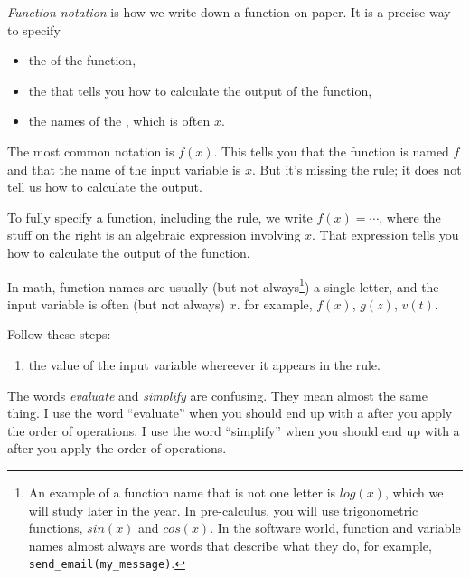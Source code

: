 \documentclass[fleqn,letterpaper,12pt,printwatermark=false]{memoir}
\begin{document}


\begin{myLesson}[][]
    \emph{Function notation}
    is how we write down a function on paper.
    It is a precise way to specify
    \begin{itemize}
        \item the  of the function,
        \item the  that tells you how to calculate the output of the function,
        \item the names of the , which is often $x$.
    \end{itemize}

    \begin{myLessonBox}
    The most common notation is $f(x)$.
    This tells you that the function is named $f$ 
    and that the name of the input variable is $x$.
    But it's missing the rule; 
    it does not tell us how to calculate the output.

    To fully specify a function, including the rule, we write $f(x) = \cdots$,
    where the stuff on the right is an algebraic expression involving $x$.
    That expression tells you how to calculate the output of the function.
    \end{myLessonBox}

    In math,
    function names are usually (but not always\footnote{
        An example of a function name that is not one letter 
        is $log(x)$, which we will study later in the year.
        In pre-calculus, you will use trigonometric functions,
        $sin(x)$ and $cos(x)$.
        In the software world, function and variable names almost always 
        are words that describe what they do, for example,
        \texttt{send\_email(my\_message)}.
    }) a single letter,
    and the input variable is often (but not always) $x$.
    for example, $f(x)$, $g(z)$, $v(t)$.

\end{myLesson}

\begin{myKeyConcepts}
    Follow these steps:
    \begin{enumerate}
        \item {} the value of the input variable whereever it appears in the rule.
    \end{enumerate}
    The words \emph{evaluate} and \emph{simplify} are confusing. 
    They mean almost the same thing.
    I use the word ``evaluate'' when you should end up with a  after you apply the order of operations.
    I use the word ``simplify'' when you should end up with a  after you apply the order of operations.
\end{myKeyConcepts}
\end{document}
